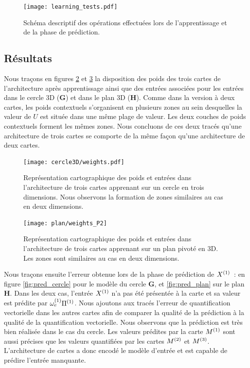 \documentclass[../main]{subfiles}
\begin{document}
\begin{figure}
	\texttt{[image: learning\_tests.pdf]}
	\caption{Schéma descriptif des opérations effectuées lors de l'apprentissage et de la phase de prédiction.\label{fig:schema_pred}}
\end{figure}

\subsection{Résultats}

Nous traçons en figures \ref{fig:w_cercle} et \ref{fig:w_plan3} la disposition des poids des trois cartes de l'architecture après apprentissage ainsi que des entrées associées pour les entrées dans le cercle 3D (\textbf{G}) et dans le plan 3D (\textbf{H}).
Comme dans la version à deux cartes, les poids contextuels s'organisent en plusieurs zones au sein desquelles la valeur de $U$ est située dans une même plage de valeur. Les deux couches de poids contextuels forment les mêmes zones.
Nous concluons de ces deux tracés qu'une architecture de trois cartes se comporte de la même façon qu'une architecture de deux cartes.

\begin{figure}[h!]
	\centering\texttt{[image: cercle3D/weights.pdf]}
	\caption{Représentation cartographique des poids et entrées dans l'architecture de trois cartes apprenant sur un cercle en trois dimensions. Nous observons la formation de zones similaires au cas en deux dimensions. \label{fig:w_cercle}}
\end{figure}

\begin{figure}[h!]
	\centering\texttt{[image: plan/weights\_P2]}
	\caption{Représentation cartographique des poids et entrées dans l'architecture de trois cartes apprenant sur un plan pivoté en 3D. Les zones sont similaires au cas en deux dimensions. \label{fig:w_plan3}}
\end{figure}

Nous traçons ensuite l'erreur obtenue lors de la phase de prédiction de $X^{({1})}$~: en figure \ref{fig:pred_cercle} pour le modèle du cercle \textbf{G}, et \ref{fig:pred_plan} sur le plan \textbf{H}.
Dans les deux cas, l'entrée $X^{({1})}$ n'a pas été présentée à la carte et sa valeur est prédite par $\omega_{e}^{({1})}{\Pi^{({1})}}$. Nous ajoutons aux tracés l'erreur de quantification vectorielle dans les autres cartes afin de comparer la qualité de la prédiction à la qualité de la quantification vectorielle.
Nous observons que la prédiction est très bien réalisée dans le cas du cercle. Les valeurs prédites par la carte $M^{({1})}$ sont aussi précises que les valeurs quantifiées par les cartes $M^{({2})}$ et $M^{({3})}$.
L'architecture de cartes a donc encodé le modèle d'entrée et est capable de prédire l'entrée manquante.
\end{document}
